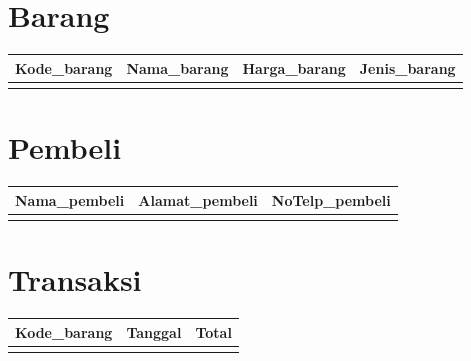 \documentclass[a4paper,12pt]{article}
\begin{document}
\section*{Barang}
\begin{table}[h!]
\begin{tabular}{|l|l|l|l|}
\hline
Kode\_barang & Nama\_barang & Harga\_barang & Jenis\_barang \\ \hline
             &              &               &               \\ \hline
\end{tabular}
\end{table}

\section*{Pembeli}
\begin{table}[h!]
\begin{tabular}{|l|l|l|}
\hline
Nama\_pembeli & Alamat\_pembeli & NoTelp\_pembeli \\ \hline
              &                 &                 \\ \hline
\end{tabular}
\end{table}

\section*{Transaksi}
\begin{table}[h!]
\begin{tabular}{|l|l|l|}
\hline
Kode\_barang & Tanggal & Total \\ \hline
             &         &       \\ \hline
\end{tabular}
\end{table}
\end{document}
